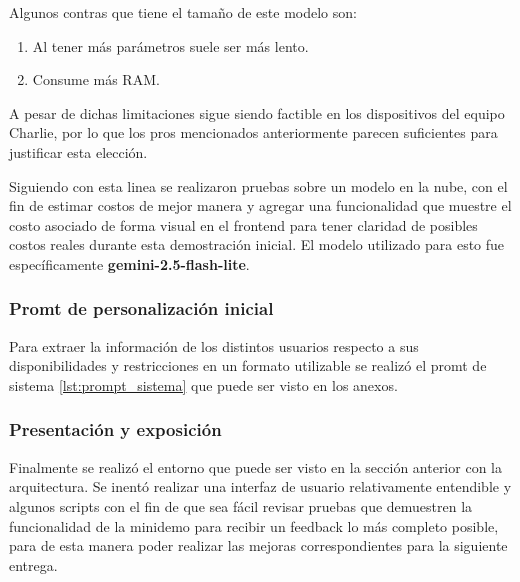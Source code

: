 Algunos contras que tiene el tamaño de este modelo son:
\begin{enumerate}
    \item Al tener más parámetros suele ser más lento.
    \item Consume más RAM.
\end{enumerate}

A pesar de dichas limitaciones sigue siendo factible en los dispositivos del equipo Charlie, por lo que los pros mencionados anteriormente parecen suficientes para justificar esta elección.


Siguiendo con esta linea se realizaron pruebas sobre un modelo en la nube, con el fin de estimar costos de mejor manera y agregar una funcionalidad que muestre el costo asociado de forma visual en el frontend para tener claridad de posibles costos reales durante esta demostración inicial. El modelo utilizado para esto fue específicamente \textbf{gemini-2.5-flash-lite}.


\subsubsection{Promt de personalización inicial}

Para extraer la información de los distintos usuarios respecto a sus disponibilidades y restricciones en un formato utilizable se realizó el promt de sistema \ref{lst:prompt_sistema} que puede ser visto en los anexos.

\subsubsection{Presentación y exposición}

Finalmente se realizó el entorno que puede ser visto en la sección anterior con la arquitectura. Se inentó realizar una interfaz de usuario relativamente entendible y algunos scripts con el fin de que sea fácil revisar pruebas que demuestren la funcionalidad de la minidemo para recibir un feedback lo más completo posible, para de esta manera poder realizar las mejoras correspondientes para la siguiente entrega.